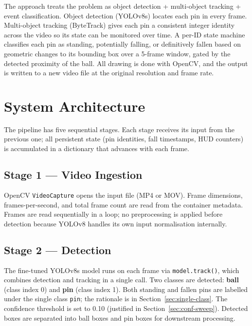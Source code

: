\documentclass[11pt,a4paper]{article}
\begin{document}
The approach treats the problem as object detection + multi-object tracking + event classification. Object detection (YOLOv8s) locates each pin in every frame. Multi-object tracking (ByteTrack) gives each pin a consistent integer identity across the video so its state can be monitored over time. A per-ID state machine classifies each pin as standing, potentially falling, or definitively fallen based on geometric changes to its bounding box over a 5-frame window, gated by the detected proximity of the ball. All drawing is done with OpenCV, and the output is written to a new video file at the original resolution and frame rate.

\section{System Architecture}

The pipeline has five sequential stages. Each stage receives its input from the previous one; all persistent state (pin identities, fall timestamps, HUD counters) is accumulated in a dictionary that advances with each frame.

\subsection{Stage 1 --- Video Ingestion}

OpenCV \texttt{VideoCapture} opens the input file (MP4 or MOV). Frame dimensions, frames-per-second, and total frame count are read from the container metadata. Frames are read sequentially in a loop; no preprocessing is applied before detection because YOLOv8 handles its own input normalisation internally.

\subsection{Stage 2 --- Detection}

The fine-tuned YOLOv8s model runs on each frame via \texttt{model.track()}, which combines detection and tracking in a single call. Two classes are detected: \textbf{ball} (class index 0) and \textbf{pin} (class index 1). Both standing and fallen pins are labelled under the single class \texttt{pin}; the rationale is in Section~\ref{sec:single-class}. The confidence threshold is set to 0.10 (justified in Section~\ref{sec:conf-sweep}). Detected boxes are separated into ball boxes and pin boxes for downstream processing.
\end{document}
